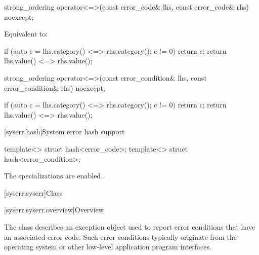 %
\begin{itemdecl}
strong_ordering operator<=>(const error_code& lhs, const error_code& rhs) noexcept;
\end{itemdecl}

\begin{itemdescr}
\pnum
\effects
Equivalent to:
\begin{codeblock}
if (auto c = lhs.category() <=> rhs.category(); c != 0) return c;
return lhs.value() <=> rhs.value();
\end{codeblock}
\end{itemdescr}

%
\begin{itemdecl}
strong_ordering operator<=>(const error_condition& lhs, const error_condition& rhs) noexcept;
\end{itemdecl}

\begin{itemdescr}
\pnum
\returns
\begin{codeblock}
if (auto c = lhs.category() <=> rhs.category(); c != 0) return c;
return lhs.value() <=> rhs.value();
\end{codeblock}
\end{itemdescr}

[syserr.hash]{System error hash support}

%
\begin{itemdecl}
template<> struct hash<error_code>;
template<> struct hash<error_condition>;
\end{itemdecl}

\begin{itemdescr}
\pnum
The specializations are enabled.
\end{itemdescr}

[syserr.syserr]{Class }

[syserr.syserr.overview]{Overview}

\pnum
The class  describes an exception object used to
report error conditions that have an associated error code. Such error
conditions typically originate from the operating system or other low-level
application program interfaces.

